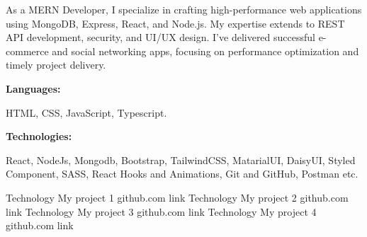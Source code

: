 \documentclass[9pt]{developercv} %
\begin{document}
\begin{minipage}[t]{0.46\textwidth}
	\vspace{-6pt}
 
	As a MERN Developer, I specialize in crafting high-performance web applications using MongoDB, Express, React, and Node.js. My expertise extends to REST API development, security, and UI/UX design. I've delivered successful e-commerce and social networking apps, focusing on performance optimization and timely project delivery. \\
\end{minipage}
\hfill %
\begin{minipage}[t]{0.465\textwidth}
    \vspace{-6pt}
    
    \begin{minipage}[t]{0.2\textwidth}
        \textbf{Languages:}
    \end{minipage}
    \hfill
    \begin{minipage}[t]{0.73\textwidth}
      {HTML, CSS, JavaScript, Typescript. }
    \end{minipage}
    \vspace{4mm}
    
    \begin{minipage}[t]{0.2\textwidth}
        \textbf{Technologies:}
    \end{minipage}
    \hfill
    \begin{minipage}[t]{0.73\textwidth}
      React, NodeJs, Mongodb, Bootstrap, TailwindCSS, MatarialUI, DaisyUI, Styled Component, SASS, React Hooks and Animations, Git and GitHub, Postman etc.
    \end{minipage}
    
\end{minipage}

\begin{entrylist}
    \entry
		{Technology}
		{My project 1}
		{github.com link}
		{%
        \lipsum[1][1-3]}
    \entry
		{Technology}
		{My project 2}
		{github.com link}
		{%
        \lipsum[1][1-3]}
	\entry
		{Technology}
		{My project 3}
		{github.com link}
		{%
        \lipsum[1][1-3]}
    \entry
		{Technology}
		{My project 4}
		{github.com link}
		{%
        \lipsum[1][1-3]}
\end{entrylist}
\end{document}
